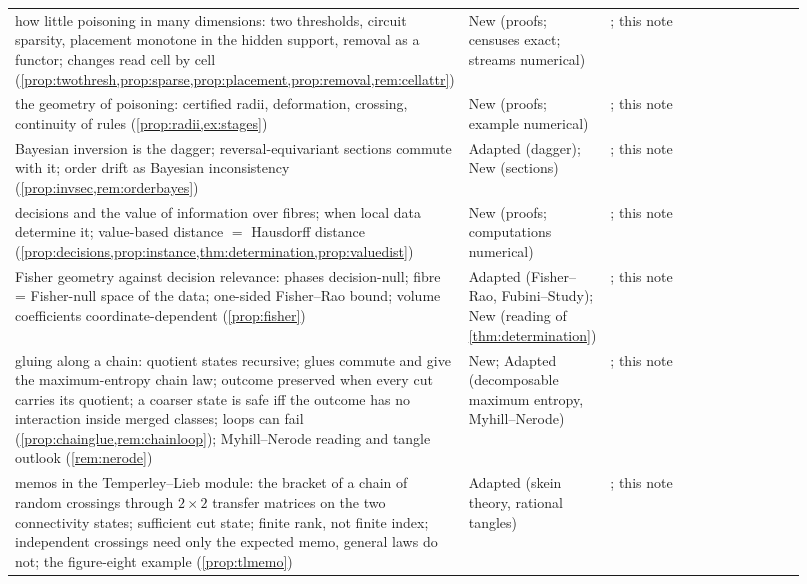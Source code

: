 \documentclass[11pt]{article}
\theoremstyle{definition}\newtheorem{definition}[theorem]{Definition}\newtheorem{remark}[theorem]{Remark}\newtheorem{example}[theorem]{Example}\newtheorem{problem}[theorem]{Open problem}\crefname{problem}{Problem}{Problems}
\begin{document}
{\begin{longtable}{p{0.46\linewidth}p{0.16\linewidth}p{0.3\linewidth}}
\rowcolor{stNew} how little poisoning in many dimensions: two thresholds, circuit sparsity, placement monotone in the hidden support, removal as a functor; changes read cell by cell (\cref{prop:twothresh,prop:sparse,prop:placement,prop:removal,rem:cellattr}) & New (proofs; censuses exact; streams numerical) & \cite{Rockafellar1969,MullerRegensburger2016,BroderickGiordanoMeager2020}; this note\\
\rowcolor{stNew} the geometry of poisoning: certified radii, deformation, crossing, continuity of rules (\cref{prop:radii,ex:stages}) & New (proofs; example numerical) & \cite{WalkupWets1969}; this note\\
\rowcolor{stAdapted} Bayesian inversion is the dagger; reversal-equivariant sections commute with it; order drift as Bayesian inconsistency (\cref{prop:invsec,rem:orderbayes}) & Adapted (dagger); New (sections) & \cite{ChoJacobs2019,Parzygnat2020,BohinenPerrone2025}; this note\\
\rowcolor{stNew} decisions and the value of information over fibres; when local data determine it; value-based distance $=$ Hausdorff distance (\cref{prop:decisions,prop:instance,thm:determination,prop:valuedist}) & New (proofs; computations numerical) & \cite{Das2023,Iskandar2026,TohmeCaterinaGangle2017,GensbittelPeskiRenault2022}; this note\\
\rowcolor{stAdapted} Fisher geometry against decision relevance: phases decision-null; fibre = Fisher-null space of the data; one-sided Fisher--Rao bound; volume coefficients coordinate-dependent (\cref{prop:fisher}) & Adapted (Fisher--Rao, Fubini--Study); New (reading of \cref{thm:determination}) & \cite{MoskowitzRussellLawless2020}; this note\\
\rowcolor{stNew} gluing along a chain: quotient states recursive; glues commute and give the maximum-entropy chain law; outcome preserved when every cut carries its quotient; a coarser state is safe iff the outcome has no interaction inside merged classes; loops can fail (\cref{prop:chainglue,rem:chainloop}); Myhill--Nerode reading and tangle outlook (\cref{rem:nerode}) & New; Adapted (decomposable maximum entropy, Myhill--Nerode) & \cite{Lauritzen1996,Nerode1958}; this note\\
\rowcolor{stAdapted} memos in the Temperley--Lieb module: the bracket of a chain of random crossings through $2\times2$ transfer matrices on the two connectivity states; sufficient cut state; finite rank, not finite index; independent crossings need only the expected memo, general laws do not; the figure-eight example (\cref{prop:tlmemo}) & Adapted (skein theory, rational tangles) & \cite{Kauffman1987,Conway1970,DiamantisKauffman2026}; this note\\

\end{longtable}}
\end{document}
